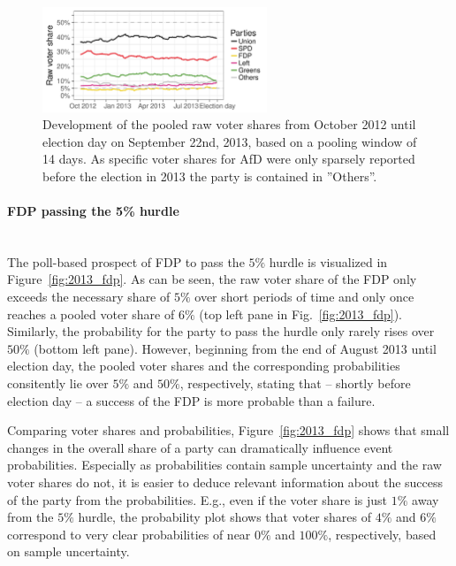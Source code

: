 \documentclass[smallcondensed]{svjour3}     %
\begin{document}
\begin{figure}[H]\centering
\includegraphics[width=0.6\textwidth]{figures/2013_pooled_rawShares.pdf}
\caption{Development of the pooled raw voter shares from October 2012 until election day on September 22nd, 2013, based on a pooling window of 14 days.
As specific voter shares for AfD were only sparsely reported before the election in 2013 the party is contained in ''Others''.
\label{fig:2013}
}
\end{figure}


\paragraph{FDP passing the 5\% hurdle} \ \\
The poll-based prospect of FDP to pass the $5\%$ hurdle is visualized in Figure~\ref{fig:2013_fdp}.
As can be seen, the raw voter share of the FDP only exceeds the necessary share
of $5\%$ over short periods of time and only once reaches a pooled voter share
of $6\%$ (top left pane in Fig.~\ref{fig:2013_fdp}). Similarly, the probability
for the party to pass the hurdle only rarely rises over $50\%$ (bottom left pane). However, beginning
from the end of August 2013 until election day, the pooled voter shares and the
corresponding probabilities consitently lie over $5\%$ and $50\%$, respectively,
stating that -- shortly before election day -- a success of the FDP is more
probable than a failure.

Comparing voter shares and probabilities, Figure~\ref{fig:2013_fdp} shows
that small changes in the overall share of a party can dramatically influence
event probabilities. Especially as probabilities contain sample uncertainty
and the raw voter shares do not, it is easier to deduce relevant information about
the success of the party from the probabilities.
E.g., even if the voter share is just $1\%$ away from the $5\%$ hurdle, the probability
plot shows that voter shares of $4\%$ and $6\%$ correspond to very clear
probabilities of near $0\%$ and $100\%$, respectively, based on sample uncertainty.
\end{document}
